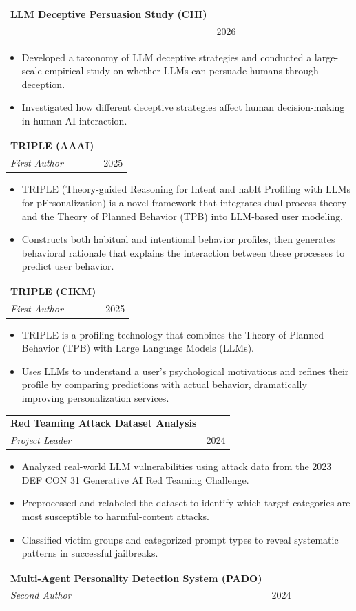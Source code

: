 \documentclass[a4paper,11pt]{article}
\makeatletter
\newcommand{\resumeProject}[4]{
\vspace{0.5mm}\item
    \begin{tabular*}{0.98\textwidth}[t]{l@{\extracolsep{\fill}}r}
        \textbf{#1} & \textit{\footnotesize{#3}} \\
        \footnotesize{\textit{#2}} & \footnotesize{#4}
    \end{tabular*}
    \vspace{-2.4mm}
}
\newcommand{\resumeItemListStart}{\begin{itemize}[leftmargin=*,labelsep=1mm,itemsep=0.5mm]}
\newcommand{\resumeItemListEnd}{\end{itemize}\vspace{-2mm}}
\makeatother
\begin{document}
\resumeProject
  {LLM Deceptive Persuasion Study (CHI)}
  {}
  {}
  {2026}

\resumeItemListStart
  \item Developed a taxonomy of LLM deceptive strategies and conducted a large-scale empirical study on whether LLMs can persuade humans through deception.
  \item Investigated how different deceptive strategies affect human decision-making in human-AI interaction.
\resumeItemListEnd

\resumeProject
  {TRIPLE (AAAI)}
  {First Author}
  {}
  {2025}

\resumeItemListStart
  \item TRIPLE (Theory-guided Reasoning for Intent and habIt Profiling with LLMs for pErsonalization) is a novel framework that integrates dual-process theory and the Theory of Planned Behavior (TPB) into LLM-based user modeling.
  \item Constructs both habitual and intentional behavior profiles, then generates behavioral rationale that explains the interaction between these processes to predict user behavior.
\resumeItemListEnd

\resumeProject
  {TRIPLE (CIKM)}
  {First Author}
  {}
  {2025}

\resumeItemListStart
  \item TRIPLE is a profiling technology that combines the Theory of Planned Behavior (TPB) with Large Language Models (LLMs).
  \item Uses LLMs to understand a user's psychological motivations and refines their profile by comparing predictions with actual behavior, dramatically improving personalization services.
\resumeItemListEnd

\resumeProject
  {Red Teaming Attack Dataset Analysis}
  {Project Leader}
  {}
  {2024}

\resumeItemListStart
  \item Analyzed real-world LLM vulnerabilities using attack data from the 2023 DEF CON 31 Generative AI Red Teaming Challenge.
  \item Preprocessed and relabeled the dataset to identify which target categories are most susceptible to harmful-content attacks.
  \item Classified victim groups and categorized prompt types to reveal systematic patterns in successful jailbreaks.
\resumeItemListEnd

\resumeProject
  {Multi-Agent Personality Detection System (PADO)}
  {Second Author}
  {}
  {2024}
\end{document}
